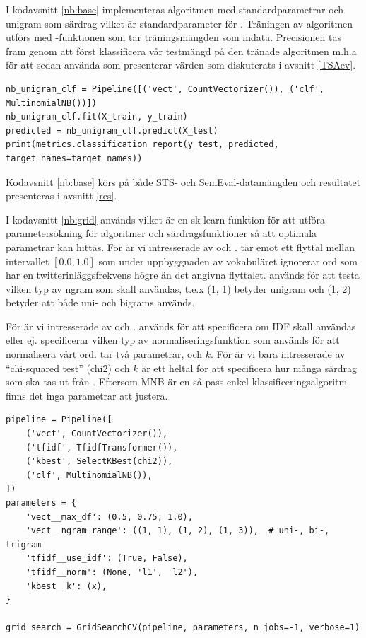 \documentclass{kaumasters} %
\begin{document}
I kodavsnitt \ref{nb:base} implementeras algoritmen  med standardparametrar \cite{scikit:004} och unigram som särdrag vilket är standardparameter för  \cite{scikit:005}. Träningen av algoritmen utförs med -funktionen som tar träningsmängden som indata. Precisionen tas fram genom att först klassificera vår testmängd på den tränade algoritmen m.h.a  för att sedan använda  som presenterar värden som diskuterats i avsnitt \ref{TSAev}.
\begin{lstlisting}[style=mypython,caption={Kod för att skapa och träna NB-klassificeraren.},label=nb:base]
nb_unigram_clf = Pipeline([('vect', CountVectorizer()), ('clf', MultinomialNB())])
nb_unigram_clf.fit(X_train, y_train)
predicted = nb_unigram_clf.predict(X_test)
print(metrics.classification_report(y_test, predicted, target_names=target_names))
\end{lstlisting}
Kodavsnitt \ref{nb:base} körs på både STS- och SemEval-datamängden och resultatet presenteras i avsnitt \ref{res}.

I kodavsnitt \ref{nb:grid} används  \cite{scikit:006} vilket är en sk-learn funktion för att utföra parametersökning för algoritmer och särdragsfunktioner så att optimala parametrar kan hittas. För  är vi intresserade av  och .  tar emot ett flyttal mellan intervallet $[0.0, 1.0]$ som under uppbyggnaden av vokabuläret ignorerar ord som har en twitterinläggsfrekvens högre än det angivna flyttalet.  används för att testa vilken typ av ngram som skall användas, t.e.x (1, 1) betyder unigram och (1, 2) betyder att både uni- och bigrams används.

För  är vi intresserade av  och .  används för att specificera om IDF skall användas eller ej.  specificerar vilken typ av normaliseringsfunktion som används för att normalisera vårt ord.  \cite{scikit:007} tar två parametrar,  och $k$. För  är vi bara intresserade av “chi-squared test” (chi2) och $k$ är ett heltal för att specificera hur många särdrag som ska tas ut från . Eftersom MNB är en så pass enkel klassificeringsalgoritm finns det inga parametrar att justera.

\begin{lstlisting}[style=mypython,caption={Kod som används till parametersökning för NB.},label=nb:grid]
pipeline = Pipeline([
    ('vect', CountVectorizer()),
    ('tfidf', TfidfTransformer()),
    ('kbest', SelectKBest(chi2)),
    ('clf', MultinomialNB()),
])
parameters = {
    'vect__max_df': (0.5, 0.75, 1.0),
    'vect__ngram_range': ((1, 1), (1, 2), (1, 3)),  # uni-, bi-, trigram
    'tfidf__use_idf': (True, False),
    'tfidf__norm': (None, 'l1', 'l2'),
    'kbest__k': (x),
}

grid_search = GridSearchCV(pipeline, parameters, n_jobs=-1, verbose=1)
\end{lstlisting}
\end{document}

